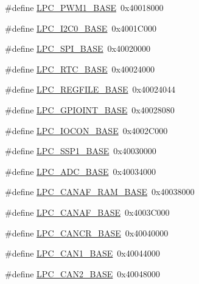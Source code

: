 \begin{DoxyCompactItemize}
\item 
\#define \hyperlink{group__PERIPH__175X__6X__BASE_gabb885bd92b4a003b94dc27c4700818bb}{L\-P\-C\-\_\-\-P\-W\-M1\-\_\-\-B\-A\-S\-E}~0x40018000
\item 
\#define \hyperlink{group__PERIPH__175X__6X__BASE_gab4476c9e874621194369f74fcf26ce92}{L\-P\-C\-\_\-\-I2\-C0\-\_\-\-B\-A\-S\-E}~0x4001\-C000
\item 
\#define \hyperlink{group__PERIPH__175X__6X__BASE_gaf611188188574ba805b6de71acc88c6c}{L\-P\-C\-\_\-\-S\-P\-I\-\_\-\-B\-A\-S\-E}~0x40020000
\item 
\#define \hyperlink{group__PERIPH__175X__6X__BASE_ga4618213cf968f8245814d7d3e7aa2e2e}{L\-P\-C\-\_\-\-R\-T\-C\-\_\-\-B\-A\-S\-E}~0x40024000
\item 
\#define \hyperlink{group__PERIPH__175X__6X__BASE_gad2674eff10cea9243ab060ad1fbac9d2}{L\-P\-C\-\_\-\-R\-E\-G\-F\-I\-L\-E\-\_\-\-B\-A\-S\-E}~0x40024044
\item 
\#define \hyperlink{group__PERIPH__175X__6X__BASE_gadf88491f4b83b5af99eaf30778cb62fa}{L\-P\-C\-\_\-\-G\-P\-I\-O\-I\-N\-T\-\_\-\-B\-A\-S\-E}~0x40028080
\item 
\#define \hyperlink{group__PERIPH__175X__6X__BASE_gae48aea115d5924805263d7a15402d4fa}{L\-P\-C\-\_\-\-I\-O\-C\-O\-N\-\_\-\-B\-A\-S\-E}~0x4002\-C000
\item 
\#define \hyperlink{group__PERIPH__175X__6X__BASE_ga05d118997f53f596d3a087f8b91a1969}{L\-P\-C\-\_\-\-S\-S\-P1\-\_\-\-B\-A\-S\-E}~0x40030000
\item 
\#define \hyperlink{group__PERIPH__175X__6X__BASE_ga2396e0d0c565e4c1c3b2fc593bd6c37f}{L\-P\-C\-\_\-\-A\-D\-C\-\_\-\-B\-A\-S\-E}~0x40034000
\item 
\#define \hyperlink{group__PERIPH__175X__6X__BASE_ga9d4f2bac61e26b32ad64d62f2be50e49}{L\-P\-C\-\_\-\-C\-A\-N\-A\-F\-\_\-\-R\-A\-M\-\_\-\-B\-A\-S\-E}~0x40038000
\item 
\#define \hyperlink{group__PERIPH__175X__6X__BASE_gabc6943f9e943d63ecf4e236b4ce7c344}{L\-P\-C\-\_\-\-C\-A\-N\-A\-F\-\_\-\-B\-A\-S\-E}~0x4003\-C000
\item 
\#define \hyperlink{group__PERIPH__175X__6X__BASE_gac22b88e108d620661add143c174f8f11}{L\-P\-C\-\_\-\-C\-A\-N\-C\-R\-\_\-\-B\-A\-S\-E}~0x40040000
\item 
\#define \hyperlink{group__PERIPH__175X__6X__BASE_gaf2407c1927ebddd767832aefa74c3398}{L\-P\-C\-\_\-\-C\-A\-N1\-\_\-\-B\-A\-S\-E}~0x40044000
\item 
\#define \hyperlink{group__PERIPH__175X__6X__BASE_gab9608b3b72dd843a25910dd2a809106b}{L\-P\-C\-\_\-\-C\-A\-N2\-\_\-\-B\-A\-S\-E}~0x40048000

\end{DoxyCompactItemize}
